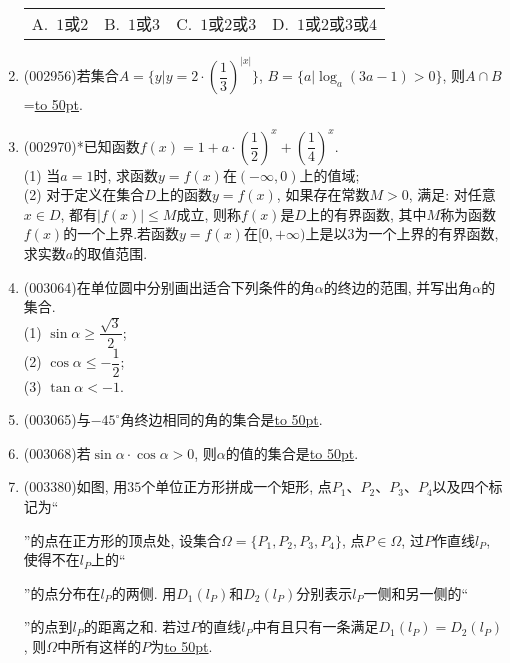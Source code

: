 \documentclass[10pt,a4paper]{article}
\newcommand{\blank}[1]{\underline{\hbox to #1pt{}}}
\newcommand{\fourch}[4]{\par\begin{tabular}{p{.23\textwidth}p{.23\textwidth}p{.23\textwidth}p{.23\textwidth}}
A.~#1 &B.~#2& C.~#3& D.~#4
\end{tabular}}
\begin{document}
\begin{enumerate}[1.]
\fourch{$1$或$2$}{$1$或$3$}{$1$或$2$或$3$}{$1$或$2$或$3$或$4$}
\item {\tiny (002956)}若集合$A=\{y|y=2\cdot (\dfrac 13)^{|x|}\}$, $B=\{ a|\log_a(3a-1)>0\}$, 则$A\cap B$=\blank{50}.
\item {\tiny (002970)}*已知函数$f(x)=1+a\cdot (\dfrac 12)^x+(\dfrac 14)^x$.\\
(1) 当$a=1$时, 求函数$y=f(x)$在$(-\infty,0)$上的值域;\\
(2) 对于定义在集合$D$上的函数$y=f(x)$, 如果存在常数$M>0$, 满足: 对任意$x\in D$, 都有$|f(x)|\le M$成立, 则称$f(x)$是$D$上的有界函数, 其中$M$称为函数$f(x)$的一个上界.若函数$y=f(x)$在$[0,+\infty)$上是以$3$为一个上界的有界函数, 求实数$a$的取值范围.
\item {\tiny (003064)}在单位圆中分别画出适合下列条件的角$\alpha$的终边的范围, 并写出角$\alpha$的集合.\\
(1) $\sin\alpha\ge \dfrac{\sqrt 3}2$;\\
(2) $\cos\alpha\le -\dfrac 12$;\\
(3) $\tan\alpha<-1$.
\item {\tiny (003065)}与$-45^\circ$角终边相同的角的集合是\blank{50}.
\item {\tiny (003068)}若$\sin\alpha\cdot\cos\alpha>0$, 则$\alpha$的值的集合是\blank{50}.
\item {\tiny (003380)}如图, 用$35$个单位正方形拼成一个矩形, 点$P_1$、$P_2$、$P_3$、$P_4$以及四个标记为``''的点在正方形的顶点处, 设集合$\Omega =\{P_1,P_2,P_3,P_4\}$, 点$P\in \Omega$, 过$P$作直线$l_P$, 使得不在$l_P$上的``''的点分布在$l_P$的两侧. 用$D_1(l_P)$和$D_2(l_P)$分别表示$l_P$一侧和另一侧的``''的点到$l_P$的距离之和. 若过$P$的直线$l_P$中有且只有一条满足$D_1(l_P)=D_2(l_P)$, 则$\Omega$中所有这样的$P$为\blank{50}.
\begin{center}
\end{center}
\end{enumerate}
\end{document}
